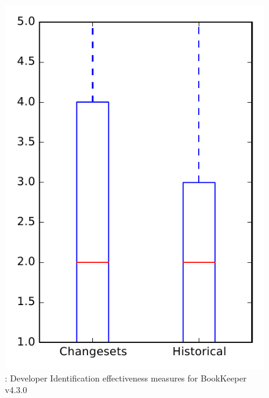 
\begin{figure}
\centering
\includegraphics[height=0.4\textheight]{figures/dit/rq2_bookkeeper_no_outlier}
\caption{\dtwo: Developer Identification effectiveness measures for BookKeeper v4.3.0}
\label{fig:dit:rq2:bookkeeper}
\end{figure}
